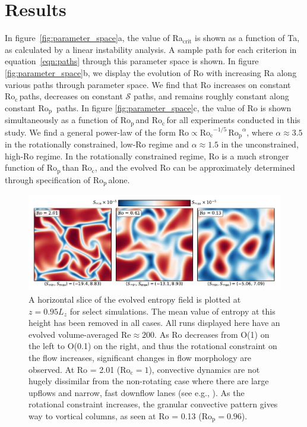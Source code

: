 \documentclass[twocolumn, amsmath, amsfonts, amssymb]{aastex62}
\newcommand{\pro}{\ensuremath{\text{Ro}_{\text{p}}}}
\newcommand{\con}{\ensuremath{\text{Ro}_{\text{c}}}}
\begin{document}
\section{Results}
\label{sec:results}
In figure~\ref{fig:parameter_space}a, the value of Ra$_{\text{crit}}$
is shown as a function of Ta, as
calculated by a linear instability analysis. A sample path for
each criterion in equation~\ref{eqn:paths} through
this parameter space is shown.
In figure \ref{fig:parameter_space}b, we display the evolution of Ro
with increasing Ra along various paths through parameter space.
We find that Ro increases on constant \con$\,$paths, decreases on constant $\mathcal{S}$
paths, and remains roughly constant along constant \pro$\,$ paths.
In figure \ref{fig:parameter_space}c, the value of Ro is shown simultaneously as
a function of \pro$\,$and \con$\,$for all experiments conducted in this study.
We find a general power-law of the form \mbox{$\text{Ro} \propto \con^{-1/5}\,\pro^{\alpha}$},
where $\alpha \approx 3.5$ in the rotationally constrained, low-Ro regime and
\mbox{$\alpha \approx 1.5$} in the unconstrained, high-Ro regime. 
In the rotationally constrained regime, Ro is a much stronger function of 
$\pro\,$than $\con$, and the
evolved Ro can be approximately determined through specification of \pro$\,$alone.


\begin{figure}[t]
    \includegraphics[width=\textwidth]{dynamics_plot.pdf}
    \caption{ A horizontal slice of the evolved entropy field is plotted at $z = 0.95L_z$
    for select simulations. The mean value of entropy at this height has been removed in all
    cases. All runs displayed here have an evolved volume-averaged $\text{Re} \approx 200$. 
    As Ro decreases from O(1) on the left to O(0.1) on the right, and thus the rotational
    constraint on the flow increases, significant changes in flow morphology are observed.
    At Ro = 2.01 ($\con = 1$), convective dynamics are not hugely dissimilar from the non-rotating
    case where there are large upflows and narrow, fast downflow lanes (see e.g., \AB).
    As the rotational constraint increases, the granular convective pattern gives way
    to vortical columns, as seen at Ro = 0.13 ($\pro = 0.96$).
    \label{fig:pretty_convection} }
\end{figure}
\end{document}
